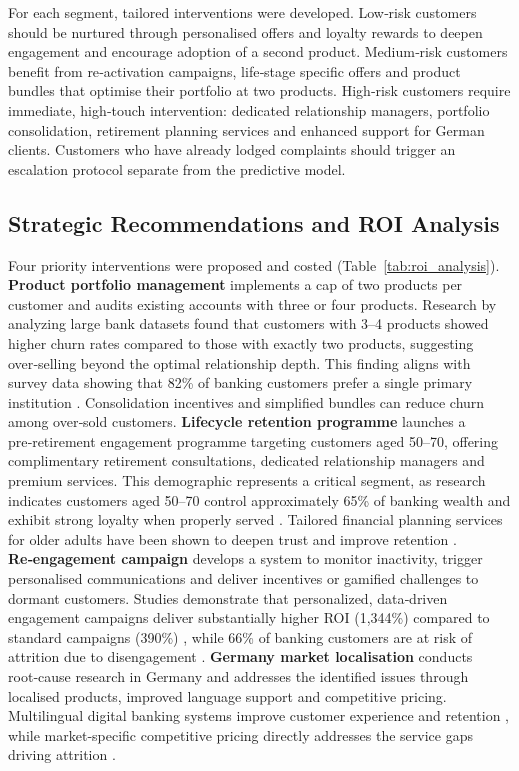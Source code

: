 \documentclass[12pt]{article}
\begin{document}
For each segment, tailored interventions were developed.  Low‑risk customers should be nurtured through personalised offers and loyalty rewards to deepen engagement and encourage adoption of a second product.  Medium‑risk customers benefit from re‑activation campaigns, life‑stage specific offers and product bundles that optimise their portfolio at two products.  High‑risk customers require immediate, high‑touch intervention: dedicated relationship managers, portfolio consolidation, retirement planning services and enhanced support for German clients.  Customers who have already lodged complaints should trigger an escalation protocol separate from the predictive model.

\subsection{Strategic Recommendations and ROI Analysis}
Four priority interventions were proposed and costed (Table~\ref{tab:roi_analysis}).  \textbf{Product portfolio management} implements a cap of two products per customer and audits existing accounts with three or four products.  Research by \citet{singh2024productchurn} analyzing large bank datasets found that customers with 3–4 products showed higher churn rates compared to those with exactly two products, suggesting over‑selling beyond the optimal relationship depth.  This finding aligns with survey data showing that 82\% of banking customers prefer a single primary institution \citep{smith2025switching}.  Consolidation incentives and simplified bundles can reduce churn among over‑sold customers.  \textbf{Lifecycle retention programme} launches a pre‑retirement engagement programme targeting customers aged 50–70, offering complimentary retirement consultations, dedicated relationship managers and premium services.  This demographic represents a critical segment, as research indicates customers aged 50–70 control approximately 65\% of banking wealth and exhibit strong loyalty when properly served \citep{marr2024aging}.  Tailored financial planning services for older adults have been shown to deepen trust and improve retention \citep{ncrc2021agefriendly}.  \textbf{Re‑engagement campaign} develops a system to monitor inactivity, trigger personalised communications and deliver incentives or gamified challenges to dormant customers.  Studies demonstrate that personalized, data‑driven engagement campaigns deliver substantially higher ROI (1,344\%) compared to standard campaigns (390\%) \citep{cline2024churn}, while 66\% of banking customers are at risk of attrition due to disengagement \citep{cornerstone2025dormant}.  \textbf{Germany market localisation} conducts root‑cause research in Germany and addresses the identified issues through localised products, improved language support and competitive pricing.  Multilingual digital banking systems improve customer experience and retention \citep{hunsicker2023multilingual}, while market‑specific competitive pricing directly addresses the service gaps driving attrition \citep{smith2025switching}.
\end{document}
